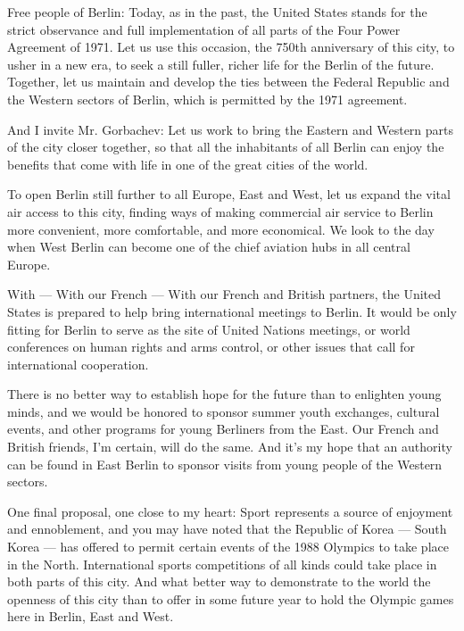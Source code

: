 \documentclass[a4paper]{amsbook}
\begin{document}
Free people of Berlin: Today, as in the past, the United States stands for the strict observance and full implementation of all parts of the Four Power Agreement of 1971. Let us use this occasion, the 750th anniversary of this city, to usher in a new era, to seek a still fuller, richer life for the Berlin of the future. Together, let us maintain and develop the ties between the Federal Republic and the Western sectors of Berlin, which is permitted by the 1971 agreement.

And I invite Mr. Gorbachev: Let us work to bring the Eastern and Western parts of the city closer together, so that all the inhabitants of all Berlin can enjoy the benefits that come with life in one of the great cities of the world.

To open Berlin still further to all Europe, East and West, let us expand the vital air access to this city, finding ways of making commercial air service to Berlin more convenient, more comfortable, and more economical. We look to the day when West Berlin can become one of the chief aviation hubs in all central Europe.

With — With our French — With our French and British partners, the United States is prepared to help bring international meetings to Berlin. It would be only fitting for Berlin to serve as the site of United Nations meetings, or world conferences on human rights and arms control, or other issues that call for international cooperation.

There is no better way to establish hope for the future than to enlighten young minds, and we would be honored to sponsor summer youth exchanges, cultural events, and other programs for young Berliners from the East. Our French and British friends, I'm certain, will do the same. And it's my hope that an authority can be found in East Berlin to sponsor visits from young people of the Western sectors.

One final proposal, one close to my heart: Sport represents a source of enjoyment and ennoblement, and you may have noted that the Republic of Korea — South Korea — has offered to permit certain events of the 1988 Olympics to take place in the North. International sports competitions of all kinds could take place in both parts of this city. And what better way to demonstrate to the world the openness of this city than to offer in some future year to hold the Olympic games here in Berlin, East and West.
\end{document}
